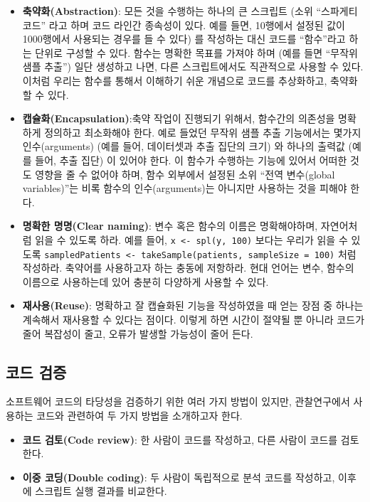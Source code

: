 \documentclass[11pt]{book}
\providecommand{\tightlist}{%
  \setlength{\itemsep}{0pt}\setlength{\parskip}{0pt}}
\theoremstyle{definition}
\theoremstyle{definition}
\theoremstyle{definition}
\theoremstyle{remark}
\begin{document}
\begin{itemize}
\tightlist
\item
  \textbf{축약화(Abstraction)}: 모든 것을 수행하는 하나의 큰 스크립트
  (소위 ``스파게티 코드'' 라고 하며 코드 라인간 종속성이 있다. 예를
  들면, 10행에서 설정된 값이 1000행에서 사용되는 경우를 들 수 있다) 를
  작성하는 대신 코드를 ``함수''라고 하는 단위로 구성할 수 있다. 함수는
  명확한 목표를 가져야 하며 (예를 들면 ``무작위 샘플 추출'') 일단
  생성하고 나면, 다른 스크립트에서도 직관적으로 사용할 수 있다. 이처럼
  우리는 함수를 통해서 이해하기 쉬운 개념으로 코드를 추상화하고,
  축약화할 수 있다.
\item
  \textbf{캡슐화(Encapsulation)}:축약 작업이 진행되기 위해서, 함수간의
  의존성을 명확하게 정의하고 최소화해야 한다. 예로 들었던 무작위 샘플
  추출 기능에서는 몇가지 인수(arguments) (예를 들어, 데이터셋과 추출
  집단의 크기) 와 하나의 출력값 (예를 들어, 추출 집단) 이 있어야 한다.
  이 함수가 수행하는 기능에 있어서 어떠한 것도 영향을 줄 수 없어야 하며,
  함수 외부에서 설정된 소위 ``전역 변수(global variables)''는 비록
  함수의 인수(arguments)는 아니지만 사용하는 것을 피해야 한다.
\item
  \textbf{명확한 명명(Clear naming)}: 변수 혹은 함수의 이름은
  명확해야하며, 자연어처럼 읽을 수 있도록 하라. 예를 들어,
  \texttt{x\ \textless{}-\ spl(y,\ 100)} 보다는 우리가 읽을 수 있도록
  \texttt{sampledPatients\ \textless{}-\ takeSample(patients,\ sampleSize\ =\ 100)}
  처럼 작성하라. 축약어를 사용하고자 하는 충동에 저항하라. 현대 언어는
  변수, 함수의 이름으로 사용하는데 있어 충분히 다양하게 사용할 수 있다.
\item
  \textbf{재사용(Reuse)}: 명확하고 잘 캡슐화된 기능을 작성하였을 때 얻는
  장점 중 하나는 계속해서 재사용할 수 있다는 점이다. 이렇게 하면 시간이
  절약될 뿐 아니라 코드가 줄어 복잡성이 줄고, 오류가 발생할 가능성이
  줄어 든다.
\end{itemize}

\subsection{코드 검증}\label{-}

소프트웨어 코드의 타당성을 검증하기 위한 여러 가지 방법이 있지만,
관찰연구에서 사용하는 코드와 관련하여 두 가지 방법을 소개하고자 한다.

\begin{itemize}
\tightlist
\item
  \textbf{코드 검토(Code review)}: 한 사람이 코드를 작성하고, 다른
  사람이 코드를 검토한다.
\item
  \textbf{이중 코딩(Double coding)}: 두 사람이 독립적으로 분석 코드를
  작성하고, 이후에 스크립트 실행 결과를 비교한다.
\end{itemize}
\end{document}
